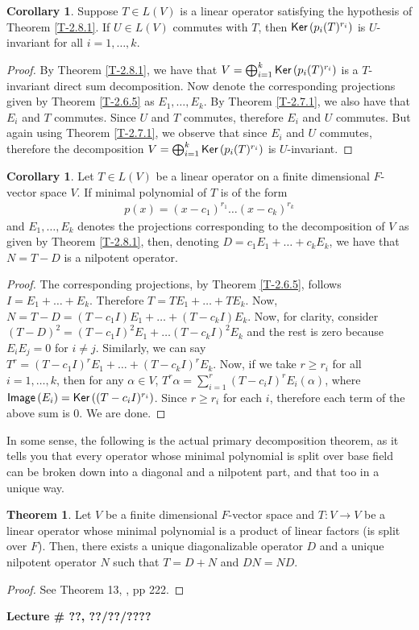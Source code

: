 \documentclass[letterpaper,11pt,twoside]{article}
\theoremstyle{definition}
\theoremstyle{definition}
\newtheorem{theorem}[proposition]{Theorem}
\theoremstyle{definition}
\theoremstyle{definition}
\theoremstyle{definition}
\theoremstyle{definition}
\theoremstyle{remark}
\theoremstyle{definition}
\newtheorem{corollary}[proposition]{Corollary}
\newcommand{\Ker}[1]{{\fontfamily{lmss}\selectfont 
		\text{Ker}\left (#1\right )
}}
\newcommand{\Image}[1]{{\fontfamily{lmss}\selectfont 
		\text{Image}\left (#1\right )
}}
\newcommand{\newlecture}[2]{\begin{center}
    \textbf{Lecture \# #1, #2}
\end{center}}
\begin{document}
    \begin{corollary}
        Suppose $T\in L(V)$ is a linear operator satisfying the hypothesis of Theorem \ref{T-2.8.1}. If $U\in L(V)$ commutes with $T$, then $\Ker{p_i(T)^{r_i}}$ is $U$-invariant for all $i=1,\dots,k$.
    \end{corollary}
    \begin{proof}
        By Theorem \ref{T-2.8.1}, we have that $V = \bigoplus_{i=1}^k \Ker{p_i(T)^{r_i}}$ is a $T$-invariant direct sum decomposition. Now denote the corresponding projections given by Theorem \ref{T-2.6.5} as $E_1,\dots,E_k$. By Theorem \ref{T-2.7.1}, we also have that $E_i$ and $T$ commutes. Since $U$ and $T$ commutes, therefore $E_i$ and $U$ commutes. But again using Theorem \ref{T-2.7.1}, we observe that since $E_i$ and $U$ commutes, therefore the decomposition $V = \bigoplus_{i=1}^k \Ker{p_i(T)^{r_i}}$ is $U$-invariant.
    \end{proof}
    \begin{corollary}
    Let $T\in L(V)$ be a linear operator on a finite dimensional $F$-vector space $V$. If minimal polynomial of $T$ is of the form 
    \begin{align*}
        p(x) = (x-c_1)^{r_1} \dots (x-c_k)^{r_k}
    \end{align*}
    and $E_1,\dots,E_k$ denotes the projections corresponding to the decomposition of $V$ as given by Theorem \ref{T-2.8.1}, then, denoting $D = c_1E_1 + \dots + c_kE_k$, we have that $N=T-D$ is a nilpotent operator.
    \end{corollary}
    \begin{proof}
        The corresponding projections, by Theorem \ref{T-2.6.5}, follows $I = E_1 + \dots + E_k$. Therefore $T = TE_1 + \dots + TE_k$. Now, $N = T-D = (T-c_1I)E_1 + \dots + (T-c_kI)E_k$. Now, for clarity, consider $(T-D)^2 = (T-c_1I)^2E_1 + \dots (T-c_kI)^2E_k $ and the rest is zero because $E_iE_j = 0$ for $i\neq j$. Similarly, we can say $T^r = (T-c_1I)^r E_1 + \dots +(T-c_kI)^r E_k$. Now, if we take $r\ge r_i$ for all $i=1,\dots,k$, then for any $\alpha \in V$, $T^r\alpha = \sum_{i=1}^r(T-c_iI)^rE_i(\alpha) $, where $\Image{E_i} = \Ker{(T-c_iI)^{r_i}}$. Since $r\ge r_i$ for each $i$, therefore each term of the above sum is $0$. We are done.
    \end{proof}
    In some sense, the following is the actual primary decomposition theorem, as it tells you that every operator whose minimal polynomial is split over base field can be broken down into a diagonal and a nilpotent part, and that too in a unique way.
    \begin{theorem}\label{T-2.8.4}
    Let $V$ be a finite dimensional $F$-vector space and $T:V\to V$ be a linear operator whose minimal polynomial is a product of linear factors (is split over $F$). Then, there exists a unique diagonalizable operator $D$ and a unique nilpotent operator $N$ such that $T = D+N$ and $DN=ND$.
    \end{theorem}
    \begin{proof}
		See Theorem 13, \cite{HK71}, pp 222.
    \end{proof}
    \newpage
    \newlecture{??}{??/??/????}
\end{document}
